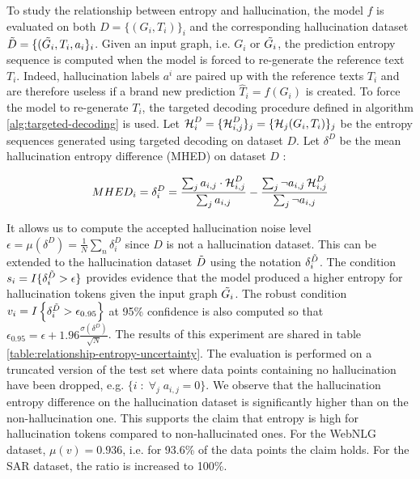 To study the relationship between entropy and hallucination, the model $f$ is evaluated on both $D = \{(G_i, T_i)\}_i$ and the corresponding hallucination dataset $\Tilde{D} = \{(\Tilde{G_i}, T_i, a_i\}_i$. Given an input graph, i.e. $G_i$ or $\Tilde{G_i}$, the prediction entropy sequence is computed when the model is forced to re-generate the reference text $T_i$. Indeed, hallucination labels $a^i$ are paired up with the reference texts $T_i$ and are therefore useless if a brand new prediction $\hat T_i = f(G_i)$ is created. To force the model to re-generate $T_i$, the targeted decoding procedure defined in algorithm \ref{alg:targeted-decoding} is used. Let $\operatorname{\mathcal{H}}_i^D = \{ \operatorname{\mathcal{H}}_{i,j}^D \}_j = \{ \operatorname{\mathcal{H}}_{j}(G_i, T_i) \}_j$ be the entropy sequences generated using targeted decoding on dataset $D$. Let $\delta^D$ be the mean hallucination entropy difference (MHED) on dataset $D$ :

\begin{equation}
    MHED_i = \delta_i^D = \frac{\sum_j a_{i,j} \cdot \operatorname{\mathcal{H}}_{i,j}^D}{\sum_j a_{i,j}} - \frac{\sum_j \neg a_{i,j} \operatorname{\mathcal{H}}_{i,j}^D}{\sum_j \neg a_{i,j}}
\end{equation}


It allows us to compute the accepted hallucination noise level $\epsilon = \mu(\delta^D) = \frac{1}{N} \sum_n \delta^D_i $ since $D$ is not a hallucination dataset. This can be extended to the hallucination dataset $\Tilde{D}$ using the notation $\delta^{\Tilde{D}}_i$. The condition $s_i = I\{\delta^{\Tilde{D}}_i > \epsilon\}$ provides evidence that the model produced a higher entropy for hallucination tokens given the input graph $\Tilde{G_i}$. The robust condition $v_i =  I\left\{\delta^{\Tilde{D}}_i > \epsilon_{0.95}\right\}$ at 95\% confidence is also computed so that $\epsilon_{0.95} = \epsilon + 1.96 \frac{\sigma(\delta^D)}{\sqrt{N}}$.
The results of this experiment are shared in table \ref{table:relationship-entropy-uncertainty}. The evaluation is performed on a truncated version of the test set where data points containing no hallucination have been dropped, e.g. $\{i \;:\; \forall_j \;a_{i,j} = 0\}$. We observe that the hallucination entropy difference on the hallucination dataset is significantly higher than on the non-hallucination one. This supports the claim that entropy is high for hallucination tokens compared to non-hallucinated ones. For the WebNLG dataset, $\mu(v) = 0.936$, i.e. for 93.6\% of the data points the claim holds. For the SAR dataset, the ratio is increased to 100\%. 



